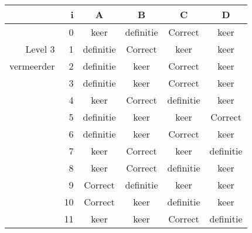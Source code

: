 \begin{tabular}{ rr| c|c|c|c}\hline\hline
     & i & \textbf{A} & \textbf{B} & \textbf{C} & \textbf{D}\\\hline

&0&keer&definitie&Correct\cellcolor[gray]{0.6}&keer\\
Level 3 & 1&definitie&Correct\cellcolor[gray]{0.6}&keer&keer\\
vermeerder &2&definitie&keer&Correct\cellcolor[gray]{0.6}&keer\\
&3&definitie&keer&Correct\cellcolor[gray]{0.6}&keer\\
&4&keer&Correct\cellcolor[gray]{0.6}&definitie&keer\\
&5&definitie&keer&keer&Correct\cellcolor[gray]{0.6}\\
&6&definitie&keer&Correct\cellcolor[gray]{0.6}&keer\\
&7&keer&Correct\cellcolor[gray]{0.6}&keer&definitie\\
&8&keer&Correct\cellcolor[gray]{0.6}&definitie&keer\\
&9&Correct\cellcolor[gray]{0.6}&definitie&keer&keer\\
&10&Correct\cellcolor[gray]{0.6}&keer&definitie&keer\\
&11&keer&keer&Correct\cellcolor[gray]{0.6}&definitie\\
\hline\end{tabular}\par\ \newline

